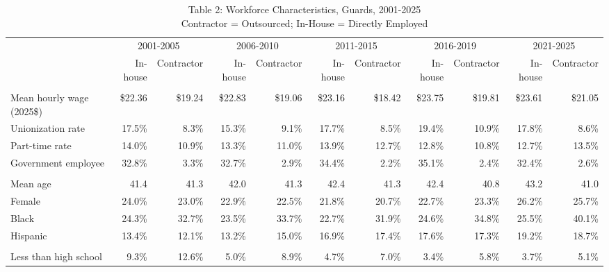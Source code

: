 \begin{table}[!t]
\caption*{
{\large Table 2: Workforce Characteristics, Guards, 2001-2025} \\
{\small Contractor = Outsourced; In-House = Directly Employed}
} 

\fontsize{10.0pt}{12.0pt}\selectfont

\centering\begin{tabular}{l|rrrrrrrrrr}
\toprule
  & \multicolumn{2}{c}{2001-2005} & \multicolumn{2}{c}{2006-2010} & \multicolumn{2}{c}{2011-2015} & \multicolumn{2}{c}{2016-2019} & \multicolumn{2}{c}{2021-2025} \\ 
\cmidrule(lr){2-3} \cmidrule(lr){4-5} \cmidrule(lr){6-7} \cmidrule(lr){8-9} \cmidrule(lr){10-11}
  & In-house & Contractor & In-house & Contractor & In-house & Contractor & In-house & Contractor & In-house & Contractor \\ 
\midrule\addlinespace[2.5pt]
\multicolumn{11}{l}{Employment and wages} \\[2.5pt] 
\midrule\addlinespace[2.5pt]
Mean hourly wage (2025\$) & \$22.36 & \$19.24 & \$22.83 & \$19.06 & \$23.16 & \$18.42 & \$23.75 & \$19.81 & \$23.61 & \$21.05 \\
Unionization rate & 17.5\% & 8.3\% & 15.3\% & 9.1\% & 17.7\% & 8.5\% & 19.4\% & 10.9\% & 17.8\% & 8.6\% \\
Part-time rate & 14.0\% & 10.9\% & 13.3\% & 11.0\% & 13.9\% & 12.7\% & 12.8\% & 10.8\% & 12.7\% & 13.5\% \\
Government employee & 32.8\% & 3.3\% & 32.7\% & 2.9\% & 34.4\% & 2.2\% & 35.1\% & 2.4\% & 32.4\% & 2.6\% \\
\midrule\addlinespace[2.5pt]
\multicolumn{11}{l}{Demographics} \\[2.5pt] 
\midrule\addlinespace[2.5pt]
Mean age & 41.4 & 41.3 & 42.0 & 41.3 & 42.4 & 41.3 & 42.4 & 40.8 & 43.2 & 41.0 \\
Female & 24.0\% & 23.0\% & 22.9\% & 22.5\% & 21.8\% & 20.7\% & 22.7\% & 23.3\% & 26.2\% & 25.7\% \\
Black & 24.3\% & 32.7\% & 23.5\% & 33.7\% & 22.7\% & 31.9\% & 24.6\% & 34.8\% & 25.5\% & 40.1\% \\
Hispanic & 13.4\% & 12.1\% & 13.2\% & 15.0\% & 16.9\% & 17.4\% & 17.6\% & 17.3\% & 19.2\% & 18.7\% \\
\midrule\addlinespace[2.5pt]
\multicolumn{11}{l}{Education} \\[2.5pt] 
\midrule\addlinespace[2.5pt]
Less than high school & 9.3\% & 12.6\% & 5.0\% & 8.9\% & 4.7\% & 7.0\% & 3.4\% & 5.8\% & 3.7\% & 5.1\% \\

\end{tabular}
\end{table}
